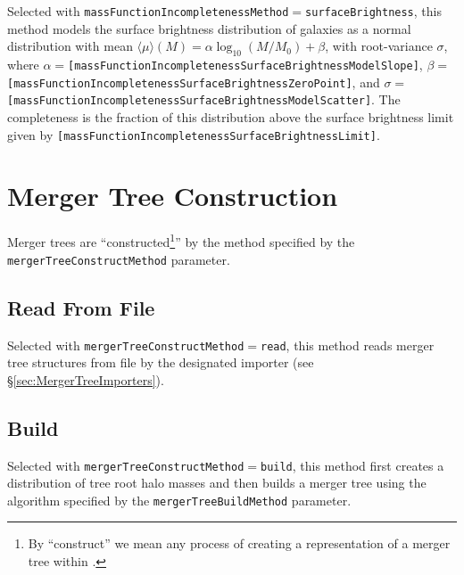 Selected with {\tt massFunctionIncompletenessMethod}$=${\tt surfaceBrightness}, this method models the surface brightness distribution of galaxies as a normal distribution with mean $\langle \mu \rangle (M) = \alpha \log_{10}(M/M_0)+\beta$, with root-variance $\sigma$, where $\alpha=${\tt [massFunctionIncompletenessSurfaceBrightnessModelSlope]}, $\beta=${\tt [massFunctionIncompletenessSurfaceBrightnessZeroPoint]}, and $\sigma=${\tt [massFunctionIncompletenessSurfaceBrightnessModelScatter]}. The completeness is the fraction of this distribution above the surface brightness limit given by {\tt [massFunctionIncompletenessSurfaceBrightnessLimit]}.

\section{Merger Tree Construction}

Merger trees are ``constructed\footnote{By ``construct'' we mean any process of creating a representation of a merger tree within \protect\glc.}'' by the method specified by the {\tt mergerTreeConstructMethod} parameter.

\subsection{Read From File}

Selected with {\tt mergerTreeConstructMethod}$=${\tt read}, this method reads merger tree structures from file by the designated importer (see \S\ref{sec:MergerTreeImporters}).

\subsection{Build}

Selected with {\tt mergerTreeConstructMethod}$=${\tt build}, this method first creates a distribution of tree root halo masses and then builds a merger tree using the algorithm specified by the {\tt mergerTreeBuildMethod} parameter.

